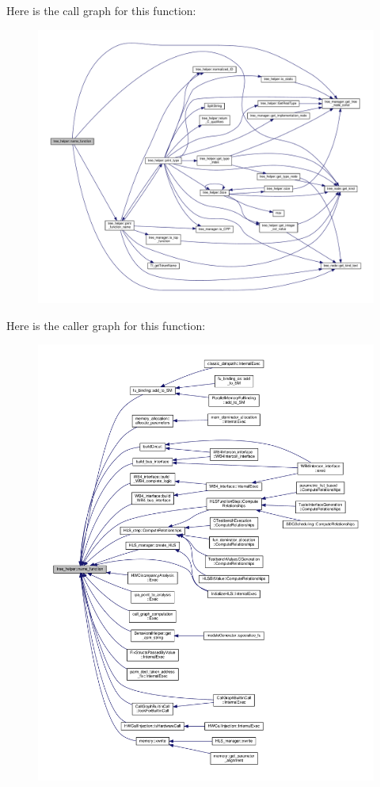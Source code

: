 Here is the call graph for this function\+:
\nopagebreak
\begin{figure}[H]
\begin{center}
\leavevmode
\includegraphics[width=350pt]{d7/d99/classtree__helper_a06ca465189be44d278bc027b82ea8e75_cgraph}
\end{center}
\end{figure}
Here is the caller graph for this function\+:
\nopagebreak
\begin{figure}[H]
\begin{center}
\leavevmode
\includegraphics[width=350pt]{d7/d99/classtree__helper_a06ca465189be44d278bc027b82ea8e75_icgraph}
\end{center}
\end{figure}
